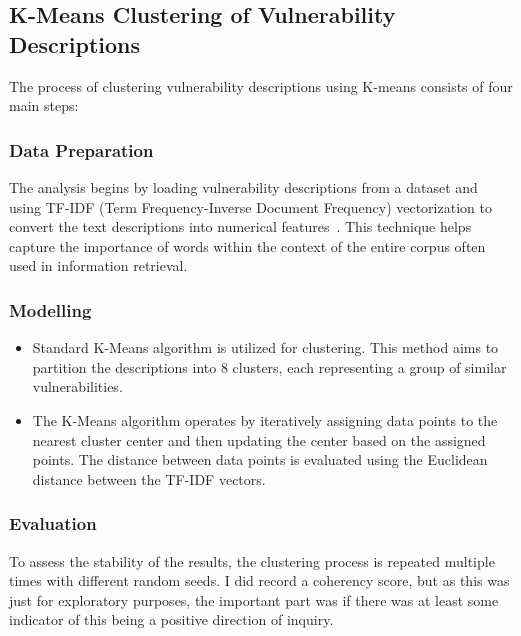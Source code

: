 \documentclass[12pt]{article}
\begin{document}
\subsection{K-Means Clustering of Vulnerability Descriptions}

The process of clustering vulnerability descriptions using K-means consists of four main steps:

\subsubsection*{Data Preparation}

The analysis begins by loading vulnerability descriptions from a dataset and using TF-IDF
(Term Frequency-Inverse Document Frequency) vectorization to convert the text
descriptions into numerical features~\cite{tfidf}. This technique helps capture the
importance of words within the context of the entire corpus often used in information
retrieval.


\subsubsection*{Modelling}

\begin{itemize}

	\item Standard K-Means algorithm is utilized for clustering. This method aims to partition the
	      descriptions into 8 clusters, each representing a group of similar
	      vulnerabilities.

	\item The K-Means algorithm operates by iteratively assigning data points to the nearest cluster
	      center and then updating the center based on the assigned points. The distance between
	      data points is evaluated using the Euclidean distance between the TF-IDF vectors.

\end{itemize}

\subsubsection*{Evaluation}


To assess the stability of the results, the clustering process is repeated multiple times
with different random seeds. I did record a coherency score, but as this was just for exploratory
purposes, the important part was if there was at least some indicator of this being a positive
direction of inquiry.
\end{document}
